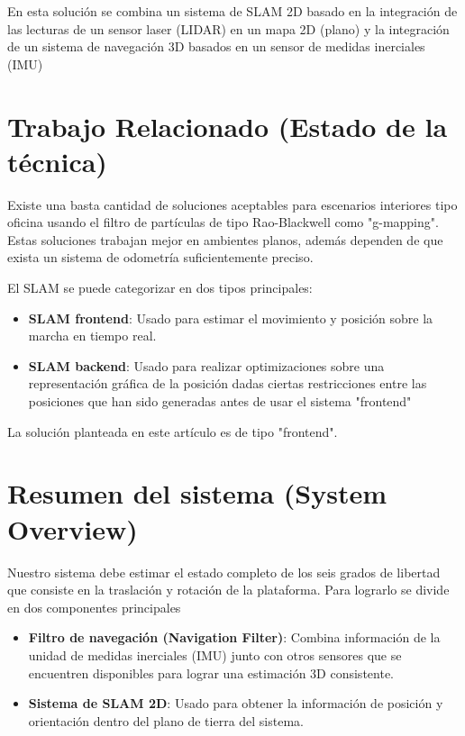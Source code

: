 \documentclass[10pt,a4paper]{article}
\begin{document}
En esta solución se combina un sistema de SLAM 2D basado en la integración de las lecturas de un sensor laser (LIDAR) en un mapa 2D (plano) y la integración de un sistema de navegación 3D basados en un sensor de medidas inerciales (IMU)

\section{Trabajo Relacionado (Estado de la técnica)}

Existe una basta cantidad de soluciones aceptables para escenarios interiores tipo oficina usando el filtro de partículas de tipo Rao-Blackwell como "g-mapping". Estas soluciones trabajan mejor en ambientes planos, además dependen de que exista un sistema de odometría suficientemente preciso.

El SLAM se puede categorizar en dos tipos principales:

\begin{itemize}

\item \textbf{SLAM frontend}: Usado para estimar el movimiento y posición sobre la marcha en tiempo real.
\item \textbf{SLAM backend}: Usado para realizar optimizaciones sobre una representación gráfica de la posición dadas ciertas restricciones entre las posiciones que han sido generadas antes de usar el sistema "frontend"

\end{itemize}

La solución planteada en este artículo es de tipo "frontend".

\section{Resumen del sistema (System Overview)}

Nuestro sistema debe estimar el estado completo de los seis grados de libertad que consiste en la traslación y rotación de la plataforma. Para lograrlo se divide en dos componentes principales

\begin{itemize}

\item \textbf{Filtro de navegación (Navigation Filter)}: Combina información de la unidad de medidas inerciales (IMU) junto con otros sensores que se encuentren disponibles para lograr una estimación 3D consistente.

\item \textbf{Sistema de SLAM 2D}: Usado para obtener la información de posición y orientación dentro del plano de tierra del sistema.

\end{itemize}
\end{document}
